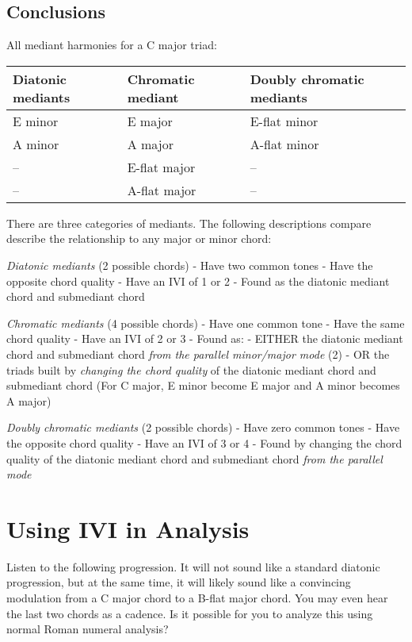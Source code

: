 \documentclass{book}
\begin{document}
\hypertarget{conclusions-30}{%
\subsection{Conclusions}\label{conclusions-30}}

All mediant harmonies for a C major triad:

\begin{longtable}[]{@{}lll@{}}
\toprule
Diatonic mediants & Chromatic mediant & Doubly chromatic mediants \\
\midrule
\endhead
E minor & E major & E-flat minor \\
A minor & A major & A-flat minor \\
-- & E-flat major & -- \\
-- & A-flat major & -- \\
\bottomrule
\end{longtable}

There are three categories of mediants. The following descriptions compare
describe the relationship to any major or minor chord:

\emph{Diatonic mediants} (2 possible chords) - Have two common tones - Have
the opposite chord quality - Have an IVI of 1 or 2 - Found as the diatonic
mediant chord and submediant chord

\emph{Chromatic mediants} (4 possible chords) - Have one common tone - Have
the same chord quality - Have an IVI of 2 or 3 - Found as: - EITHER the
diatonic mediant chord and submediant chord \emph{from the parallel
minor/major mode} (2) - OR the triads built by \emph{changing the chord
quality} of the diatonic mediant chord and submediant chord (For C major, E
minor become E major and A minor becomes A major)

\emph{Doubly chromatic mediants} (2 possible chords) - Have zero common tones
- Have the opposite chord quality - Have an IVI of 3 or 4 - Found by changing
the chord quality of the diatonic mediant chord and submediant chord
\emph{from the parallel mode}

\hypertarget{using-ivi-in-analysis}{%
\section{Using IVI in Analysis}\label{using-ivi-in-analysis}}

Listen to the following progression. It will not sound like a standard
diatonic progression, but at the same time, it will likely sound like a
convincing modulation from a C major chord to a B-flat major chord. You may
even hear the last two chords as a cadence. Is it possible for you to analyze
this using normal Roman numeral analysis?
\end{document}
